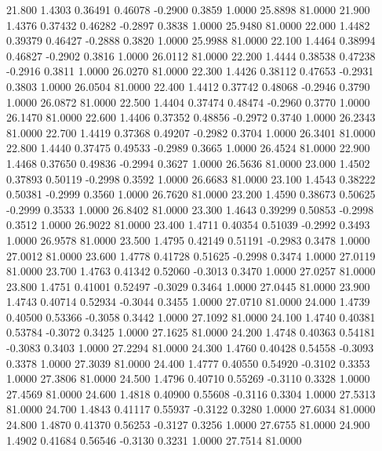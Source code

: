   21.800   1.4303   0.36491   0.46078  -0.2900   0.3859   1.0000  25.8898  81.0000
  21.900   1.4376   0.37432   0.46282  -0.2897   0.3838   1.0000  25.9480  81.0000
  22.000   1.4482   0.39379   0.46427  -0.2888   0.3820   1.0000  25.9988  81.0000
  22.100   1.4464   0.38994   0.46827  -0.2902   0.3816   1.0000  26.0112  81.0000
  22.200   1.4444   0.38538   0.47238  -0.2916   0.3811   1.0000  26.0270  81.0000
  22.300   1.4426   0.38112   0.47653  -0.2931   0.3803   1.0000  26.0504  81.0000
  22.400   1.4412   0.37742   0.48068  -0.2946   0.3790   1.0000  26.0872  81.0000
  22.500   1.4404   0.37474   0.48474  -0.2960   0.3770   1.0000  26.1470  81.0000
  22.600   1.4406   0.37352   0.48856  -0.2972   0.3740   1.0000  26.2343  81.0000
  22.700   1.4419   0.37368   0.49207  -0.2982   0.3704   1.0000  26.3401  81.0000
  22.800   1.4440   0.37475   0.49533  -0.2989   0.3665   1.0000  26.4524  81.0000
  22.900   1.4468   0.37650   0.49836  -0.2994   0.3627   1.0000  26.5636  81.0000
  23.000   1.4502   0.37893   0.50119  -0.2998   0.3592   1.0000  26.6683  81.0000
  23.100   1.4543   0.38222   0.50381  -0.2999   0.3560   1.0000  26.7620  81.0000
  23.200   1.4590   0.38673   0.50625  -0.2999   0.3533   1.0000  26.8402  81.0000
  23.300   1.4643   0.39299   0.50853  -0.2998   0.3512   1.0000  26.9022  81.0000
  23.400   1.4711   0.40354   0.51039  -0.2992   0.3493   1.0000  26.9578  81.0000
  23.500   1.4795   0.42149   0.51191  -0.2983   0.3478   1.0000  27.0012  81.0000
  23.600   1.4778   0.41728   0.51625  -0.2998   0.3474   1.0000  27.0119  81.0000
  23.700   1.4763   0.41342   0.52060  -0.3013   0.3470   1.0000  27.0257  81.0000
  23.800   1.4751   0.41001   0.52497  -0.3029   0.3464   1.0000  27.0445  81.0000
  23.900   1.4743   0.40714   0.52934  -0.3044   0.3455   1.0000  27.0710  81.0000
  24.000   1.4739   0.40500   0.53366  -0.3058   0.3442   1.0000  27.1092  81.0000
  24.100   1.4740   0.40381   0.53784  -0.3072   0.3425   1.0000  27.1625  81.0000
  24.200   1.4748   0.40363   0.54181  -0.3083   0.3403   1.0000  27.2294  81.0000
  24.300   1.4760   0.40428   0.54558  -0.3093   0.3378   1.0000  27.3039  81.0000
  24.400   1.4777   0.40550   0.54920  -0.3102   0.3353   1.0000  27.3806  81.0000
  24.500   1.4796   0.40710   0.55269  -0.3110   0.3328   1.0000  27.4569  81.0000
  24.600   1.4818   0.40900   0.55608  -0.3116   0.3304   1.0000  27.5313  81.0000
  24.700   1.4843   0.41117   0.55937  -0.3122   0.3280   1.0000  27.6034  81.0000
  24.800   1.4870   0.41370   0.56253  -0.3127   0.3256   1.0000  27.6755  81.0000
  24.900   1.4902   0.41684   0.56546  -0.3130   0.3231   1.0000  27.7514  81.0000
